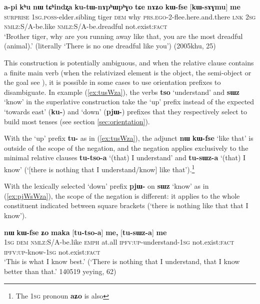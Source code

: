 \documentclass[oneside,a4paper,11pt]{article}
\newcommand{\ipa}[1]{{\phon\textbf{#1}}} %
\newcommand{\forme}[2]{\ipa{#1} `#2'}
\begin{document}
 \begin{exe}
\ex \label{ex:kWfse.me}
\gll \ipa{ama} 	\ipa{a-pi} 	\ipa{kʰu} 	\ipa{nɯ} 	\ipa{tɕʰindʐa} 	\ipa{ku-tɯ-nɤpʰɯpʰɣo} 	\ipa{tɕe}  \ipa{nɤʑo} 	\ipa{kɯ-fse} 	[\ipa{kɯ-sɤɣmu}] 	\ipa{me} 	\\
\textsc{surprise} \textsc{1sg.poss}-elder.sibling tiger \textsc{dem} why \textsc{prs.ego}-2-flee.here.and.there \textsc{lnk} \textsc{2sg}  \textsc{nmlz}:S/A-be.like   \textsc{nmlz}:S/A-be.dreadful  not.exist:\textsc{fact} \\
\glt `Brother tiger, why are you running away like that, you are the most dreadful (animal).' (literally `There is no one dreadful like you') (2005khu, 25)
\end{exe}

This construction is potentially ambiguous, and when the relative clause contains a finite main verb (when the relativized element is the object, the semi-object or the goal see \citealt{jacques16relatives}), it is possible in some cases to use orientation prefixes to disambiguate. In example (\ref{ex:tusWza}), the verbs \forme{tso}{understand} and \forme{sɯz}{know} in the superlative construction take the `up' prefix instead of the expected `towards east' (\ipa{ku-}) and `down' (\ipa{pjɯ-}) prefixes that they respectively select to build most tenses (see section \ref{sec:orientation}).

With the `up' prefix \ipa{tu-} as in (\ref{ex:tusWza}), the adjunct \ipa{nɯ} \ipa{kɯ-fse} `like that' is outside of the scope of the negation, and the negation applies exclusively to the minimal relative clauses \ipa{tu-tso-a} `(that) I understand' and \ipa{tu-sɯz-a} `(that) I know' (`[there is nothing that I understand/know] like that').\footnote{The \textsc{1sg} pronoun \ipa{aʑo} is also }

With the lexically selected `down' prefix \ipa{pjɯ-} on \forme{sɯz}{know} as in (\ref{ex:pjWsWza}), the scope of the negation is different: it applies to the whole constituent indicated between square brackets (`there is nothing like that that I know').
 
\begin{exe}
\ex \label{ex:tusWza}
\gll \ipa{aʑo} 	\ipa{nɯ} 	\ipa{kɯ-fse} 	\ipa{ʑo} 	\ipa{maka} [\ipa{tu-tso-a}] 	\ipa{me,} [\ipa{tu-sɯz-a}] 	\ipa{me} \\
\textsc{1sg} \textsc{dem} \textsc{nmlz}:S/A-be.like \textsc{emph} at.all \textsc{ipfv:up}-understand-\textsc{1sg} not.exist:\textsc{fact} \textsc{ipfv:up}-know-\textsc{1sg} not.exist:\textsc{fact} \\
\glt `This is what I know best.' (`There is nothing that I understand, that I know better than that.' 140519 yeying, 62)
\end{exe}
\end{document}
